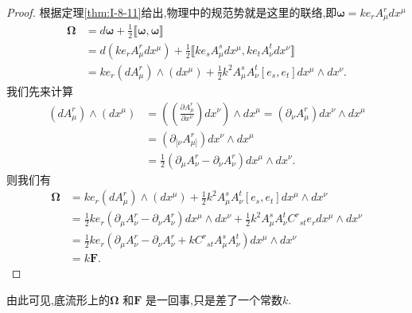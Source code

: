 \documentclass[../main.tex]{subfiles}
\begin{document}
\begin{proof}
  根据定理\ref{thm:I-8-11}给出,物理中的规范势就是这里的联络,即$\bm{\omega} = k e_r A^r_\mu dx^\mu $
  \begin{align*}
    \bm{\Omega} &= d\bm{\omega} + \frac{1}{2} \llbracket \bm{\omega} ,\bm{\omega}  \rrbracket  \\
                & = d(k e_r A^r_\mu dx^\mu) + \frac{1}{2} \llbracket k e_s A^s_\mu dx^\mu,k e_t A^t_\nu dx^\nu \rrbracket \\
                & = ke_r (d A^r_\mu)\wedge (dx^\mu) + \frac{1}{2} k^2 A^s_\mu A^t_\nu[e_s,e_t]dx^\mu \wedge dx^\nu
  .\end{align*}
  我们先来计算
  \begin{align*}
    (d A^r_\mu)\wedge (dx^\mu)& = ((\frac{\partial A^r_\mu}{\partial x^\nu} )d x^\nu) \wedge dx^\mu  =(\partial_\nu A^r_\mu) dx^\nu \wedge dx^\mu \\
                              & =  (\partial_{[\nu}A^r_{\mu]})dx^\nu \wedge dx^\mu \\ &= \frac{1}{2}(\partial_\mu A_\nu^r - \partial_\nu A_\nu^r )dx^\mu \wedge dx^\nu
  .\end{align*}
  则我们有
  \begin{align*}
   \bm{\Omega} & = ke_r (d A^r_\mu)\wedge (dx^\mu) + \frac{1}{2} k^2 A^s_\mu A^t_\nu[e_s,e_t]dx^\mu \wedge dx^\nu \\
               & = \frac{1}{2}k e_r(\partial_\mu A_\nu^r - \partial_\nu A_\nu^r )dx^\mu \wedge dx^\nu + \frac{1}{2} k^2 A^s_\mu A^t_\nu C^{r}{}_{st} e_r dx^\mu \wedge dx^\nu\\
               & = \frac{1}{2} ke_r (\partial_\mu A_\nu^r - \partial_\nu A_\nu^r + k  C^{r}{}_{st} A^s_\mu A^t_\nu ) dx^\mu \wedge dx^\nu\\
               & = k \bm{F} 
  .\end{align*}
\end{proof}
\begin{note}
  由此可见,底流形上的$\bm{\Omega}$ 和$\bm{F} $ 是一回事,只是差了一个常数$k$.
\end{note}
\end{document}
